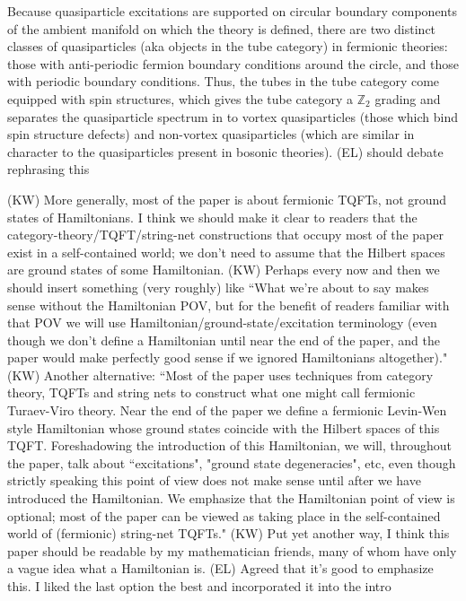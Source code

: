 \documentclass[12pt,a4paper]{article}
\newcommand{\zt}{\mathbb{Z}_2}
\newcommand{\kw}[1]{{\color{kwcolor}\footnotesize{(KW) #1}}}
\newcommand{\ethan}[1]{{\color{amethyst}\footnotesize{(EL) #1}}}
\begin{document}
Because quasiparticle excitations are supported on circular boundary components of the ambient 
manifold on which the theory is defined, there are two distinct classes of quasiparticles (aka objects in the tube category) in 
fermionic theories: those with anti-periodic fermion boundary conditions around the circle, and 
those with periodic boundary conditions. 
Thus, the tubes in the tube category come equipped with spin structures, which gives the tube category a $\zt$ grading
and separates the quasiparticle spectrum in to vortex quasiparticles (those which bind spin structure defects) 
and non-vortex quasiparticles (which are similar in character to the quasiparticles present in bosonic theories). 
\ethan{should debate rephrasing this}



\kw{More generally, most of the paper is about fermionic TQFTs, not ground states of Hamiltonians.
I think we should make it clear to readers that the category-theory/TQFT/string-net constructions that occupy most of the paper
exist in a self-contained world; we don't need to assume that the Hilbert spaces are ground states of
some Hamiltonian.}
\kw{Perhaps every now and then we should insert something (very roughly) like
``What we're about to say makes sense without the Hamiltonian POV, but for the benefit of readers familiar with
that POV we will use Hamiltonian/ground-state/excitation terminology (even though we don't define a Hamiltonian until near the end of the paper,
and the paper would make perfectly good sense if we ignored Hamiltonians altogether)."}
\kw{Another alternative: ``Most of the paper uses techniques from category theory, TQFTs and string nets to construct what one
might call fermionic Turaev-Viro theory.
Near the end of the paper we define a fermionic Levin-Wen style Hamiltonian whose ground states coincide with 
the Hilbert spaces of this TQFT.
Foreshadowing the introduction of this Hamiltonian, we will, throughout the paper, talk about ``excitations", "ground state degeneracies", etc, even though
strictly speaking this point of view does not make sense until after we have introduced the Hamiltonian.
We emphasize that the Hamiltonian point of view is optional; most of the paper can be viewed as taking place
in the self-contained world of (fermionic) string-net TQFTs."}
\kw{Put yet another way, I think this paper should be readable by my mathematician friends, many of whom
have only a vague idea what a Hamiltonian is.}
\ethan{Agreed that it's good to emphasize this. I liked the last option the best and incorporated it into the intro}
\end{document}
